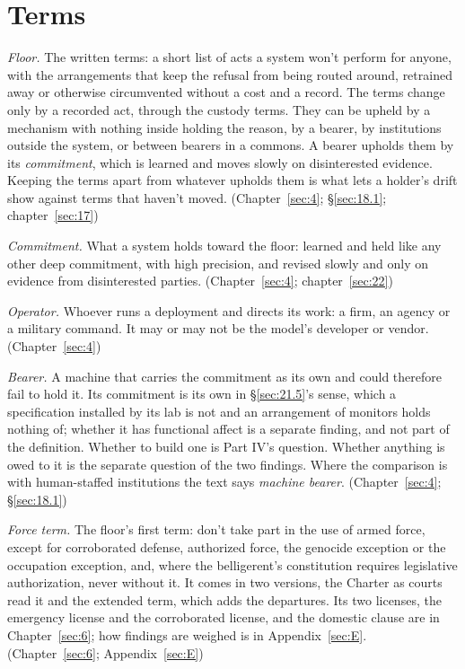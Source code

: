 \chapter*{Terms}
\emph{Floor.} The written terms: a short list of acts a system won't perform for anyone, with the arrangements that keep the refusal from being routed around, retrained away or otherwise circumvented without a cost and a record. The terms change only by a recorded act, through the custody terms. They can be upheld by a mechanism with nothing inside holding the reason, by a bearer, by institutions outside the system, or between bearers in a commons. A bearer upholds them by its \emph{commitment}, which is learned and moves slowly on disinterested evidence. Keeping the terms apart from whatever upholds them is what lets a holder's drift show against terms that haven't moved. (Chapter~\ref{sec:4}; \S\ref{sec:18.1}; chapter~\ref{sec:17})

\emph{Commitment.} What a system holds toward the floor: learned and held like any other deep commitment, with high precision, and revised slowly and only on evidence from disinterested parties. (Chapter~\ref{sec:4}; chapter~\ref{sec:22})

\emph{Operator.} Whoever runs a deployment and directs its work: a firm, an agency or a military command. It may or may not be the model's developer or vendor. (Chapter~\ref{sec:4})

\emph{Bearer.} A machine that carries the commitment as its own and could therefore fail to hold it. Its commitment is its own in \S\ref{sec:21.5}'s sense, which a specification installed by its lab is not and an arrangement of monitors holds nothing of; whether it has functional affect is a separate finding, and not part of the definition. Whether to build one is Part IV's question. Whether anything is owed to it is the separate question of the two findings. Where the comparison is with human-staffed institutions the text says \emph{machine bearer}. (Chapter~\ref{sec:4}; \S\ref{sec:18.1})

\emph{Force term.} The floor's first term: don't take part in the use of armed force, except for corroborated defense, authorized force, the genocide exception or the occupation exception, and, where the belligerent's constitution requires legislative authorization, never without it. It comes in two versions, the Charter as courts read it and the extended term, which adds the departures. Its two licenses, the emergency license and the corroborated license, and the domestic clause are in Chapter~\ref{sec:6}; how findings are weighed is in Appendix~\ref{sec:E}. (Chapter~\ref{sec:6}; Appendix~\ref{sec:E})

